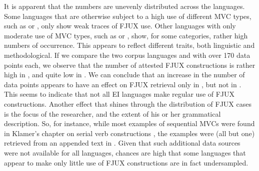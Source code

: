 It is apparent that the numbers are unevenly distributed across the languages. Some languages that are otherwise subject to a high use of different MVC types, such as  or , only show weak traces of FJUX use. Other languages with only moderate use of MVC types, such as  or , show, for some categories, rather high numbers of occurrence. This appears to reflect different traits, both linguistic and methodological. If we compare the two corpus languages  and  with over 170 data points each, we observe that the number of attested FJUX constructions is rather high in , and quite low in . We can conclude that an increase in the number of data points appears to have an effect on FJUX retrieval only in , but not in . This seems to indicate that not all EI languages make regular use of FJUX constructions. Another effect that shines through the distribution of FJUX cases is the focus of the researcher, and the extent of his or her grammatical description. So, for instance, while most  examples of sequential MVCs were found in Klamer's chapter on serial verb constructions \citep{klamer2010grammar}, the  examples were (all but one) retrieved from an appended text in \citet{ode2002sketch}. Given that such additional data sources were not available for all languages, chances are high that some languages that appear to make only little use of FJUX constructions are in fact undersampled.


